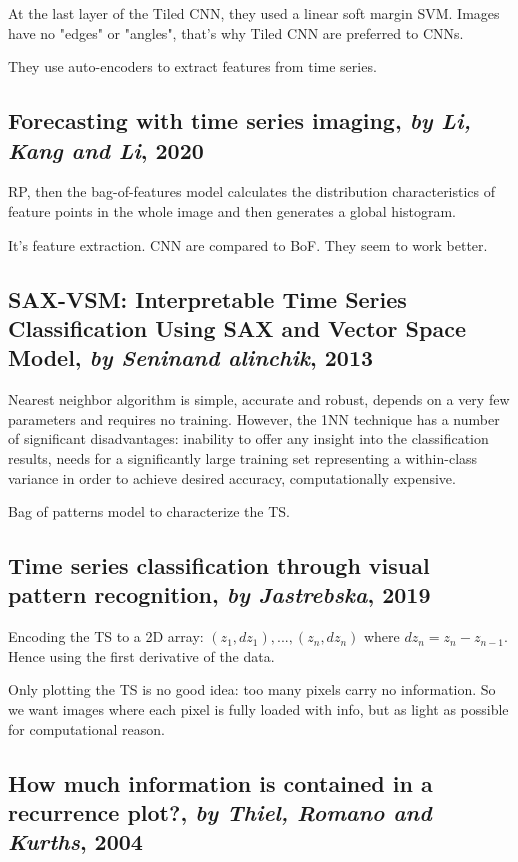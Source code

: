 \documentclass[11pt]{article}
\begin{document}
\begin{onehalfspace}
At the last layer of the Tiled CNN, they used a linear soft margin SVM. Images have no "edges" or "angles", that's why Tiled CNN are preferred to CNNs.

They use auto-encoders to extract features from time series.

\subsection{Forecasting with time series imaging, \textit{by Li, Kang and Li}, 2020}

RP, then the bag-of-features model calculates the distribution characteristics of feature points in the whole image and then generates a global histogram. 

It's feature extraction. CNN are compared to BoF. They seem to work better.

\subsection{SAX-VSM: Interpretable Time Series Classiﬁcation Using SAX and Vector Space Model, \textit{by Seninand alinchik}, 2013}

Nearest neighbor algorithm is simple, accurate and robust, depends on a very few parameters and requires no training. However, the 1NN technique has a number of signiﬁcant disadvantages: inability to offer any insight into the classiﬁcation results, needs for a signiﬁcantly large training set representing a within-class variance in order to achieve desired accuracy, computationally expensive. 

Bag of patterns model to characterize the TS.

\subsection{Time series classification through visual pattern recognition, \textit{by Jastrebska}, 2019}

Encoding the TS to a 2D array: $(z_1, dz_1), ..., (z_n, dz_n)$ where $dz_n = z_n - z_{n-1}$. Hence using the first derivative of the data.

Only plotting the TS is no good idea: too many pixels carry no information. So we want images where each pixel is fully loaded with info, but as light as possible for computational reason.

\subsection{How much information is contained in a recurrence plot?, \textit{by Thiel, Romano and Kurths}, 2004}


\end{onehalfspace}
\end{document}
